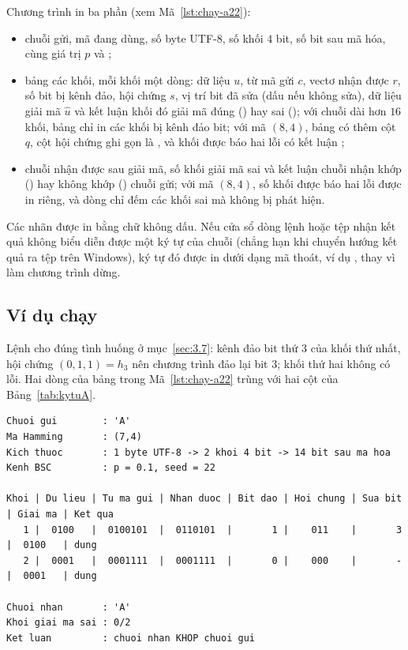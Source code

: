 Chương trình in ba phần (xem Mã~\ref{lst:chay-a22}):
\begin{itemize}
  \item chuỗi gửi, mã đang dùng, số byte UTF-8, số khối $4$ bit, số bit sau mã
        hóa, cùng giá trị $p$ và ;
  \item bảng các khối, mỗi khối một dòng: dữ liệu $u$, từ mã gửi $c$, vectơ
        nhận được $r$, số bit bị kênh đảo, hội chứng $s$, vị trí bit đã sửa
        (dấu \code{-} nếu không sửa), dữ liệu giải mã $\hat{u}$ và kết luận khối
        đó giải mã đúng () hay sai (); với chuỗi dài hơn
        $16$ khối, bảng chỉ in các khối bị kênh đảo bit; với mã $(8,4)$, bảng có
        thêm cột $q$, cột hội chứng ghi gọn là , và khối được báo hai
        lỗi có kết luận ;
  \item chuỗi nhận được sau giải mã, số khối giải mã sai và kết luận chuỗi nhận
        khớp () hay không khớp () chuỗi gửi; với
        mã $(8,4)$, số khối được báo hai lỗi được in riêng, và dòng
         chỉ đếm các khối sai mà không bị phát hiện.
\end{itemize}
Các nhãn được in bằng chữ không dấu. Nếu cửa sổ dòng lệnh hoặc tệp nhận kết quả
không biểu diễn được một ký tự của chuỗi (chẳng hạn khi chuyển hướng kết quả ra
tệp trên Windows), ký tự đó được in dưới dạng mã thoát, ví dụ
, thay vì làm chương trình dừng.

\subsection{Ví dụ chạy}
\label{ss:4.5.4}

Lệnh  cho đúng tình huống ở
mục~\ref{sec:3.7}: kênh đảo bit thứ $3$ của khối thứ nhất, hội chứng
$(0,1,1) = h_3$ nên chương trình đảo lại bit $3$; khối thứ hai không có lỗi.
Hai dòng của bảng trong Mã~\ref{lst:chay-a22} trùng với hai cột của
Bảng~\ref{tab:kytuA}.

\par\medskip\noindent
\begin{minipage}{\linewidth}
\label{lst:chay-a22}
\end{minipage}
\par\nopagebreak
\begin{Verbatim}[fontsize=\scriptsize]
Chuoi gui        : 'A'
Ma Hamming       : (7,4)
Kich thuoc       : 1 byte UTF-8 -> 2 khoi 4 bit -> 14 bit sau ma hoa
Kenh BSC         : p = 0.1, seed = 22

Khoi | Du lieu | Tu ma gui | Nhan duoc | Bit dao | Hoi chung | Sua bit | Giai ma | Ket qua
   1 |  0100   |  0100101  |  0110101  |       1 |    011    |       3 |  0100   | dung
   2 |  0001   |  0001111  |  0001111  |       0 |    000    |       - |  0001   | dung

Chuoi nhan       : 'A'
Khoi giai ma sai : 0/2
Ket luan         : chuoi nhan KHOP chuoi gui
\end{Verbatim}


